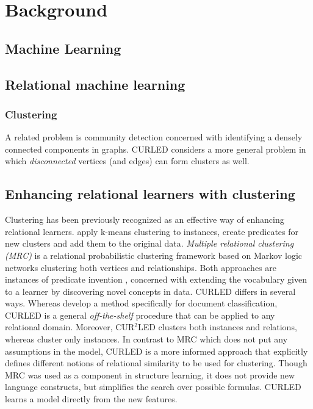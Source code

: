 \chapter{Background}\label{ch:background}


\section{Machine Learning}

\section{Relational machine learning}

\subsection{Clustering}

A related problem is community detection \cite{Karypis:1998:FHQ:305219.305248,Fortunato201075} concerned with identifying a densely connected components in graphs.
CURLED considers a more general problem in which \textit{disconnected} vertices (and edges) can form clusters as well.


\section{Enhancing relational learners with clustering}

Clustering has been previously recognized as an effective way of enhancing relational learners.
\cite{Popescul2004} apply k-means clustering to instances, create predicates for new clusters and add them to the original data.
\textit{Multiple relational clustering (MRC)} \cite{Kok2007,Kok2008} is a relational probabilistic clustering framework based on Markov logic networks \cite{Richardson2006} clustering both vertices and relationships. 
Both approaches are instances of predicate invention \cite{Kramer1995,Craven2001}, concerned with extending the vocabulary given to a learner by discovering novel concepts in data.
CURLED differs in several ways.
Whereas \cite{Popescul2004} develop a method specifically  for document classification, CURLED is a general \textit{off-the-shelf} procedure that can be applied to any relational domain.
Moreover, CUR$^2$LED clusters both instances and relations, whereas \cite{Popescul2004} cluster only instances.
In contrast to MRC which does not put any assumptions in the model, CURLED is a more informed approach that explicitly defines different notions of relational similarity to be used for clustering.
Though MRC was used as a component in structure learning, it does not provide new language constructs, but simplifies the search over possible formulas.
CURLED learns a model directly from the new features.




